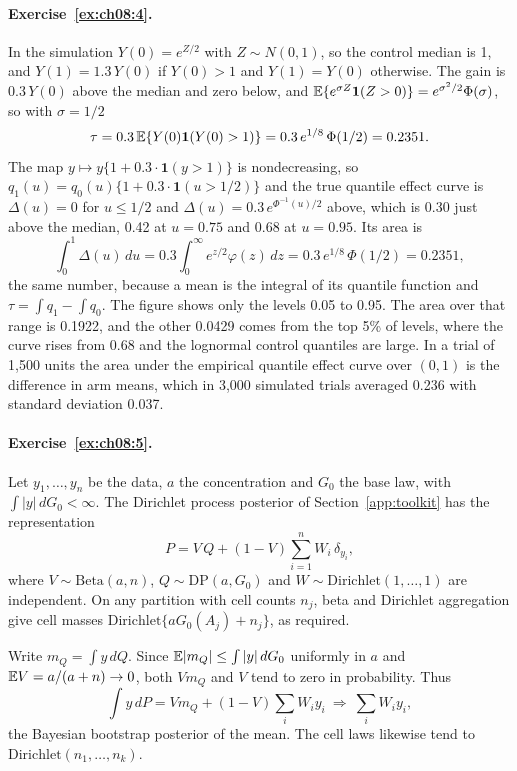 \paragraph{Exercise~\ref{ex:ch08:4}.} In the simulation $Y(0) = e^{Z/2}$ with $Z \sim N(0,1)$, so the control median is 1, and $Y(1) = 1.3\,Y(0)$ if $Y(0) > 1$ and $Y(1) = Y(0)$ otherwise. The gain is $0.3\,Y(0)$ above the median and zero below, and $\mathbb{E}\{e^{\sigma Z}\mathbf{1}(Z > 0)\} = e^{\sigma^2/2}\Phi(\sigma)$, so with $\sigma = 1/2$
\[
\tau = 0.3\,\mathbb{E}\{Y(0)\mathbf{1}(Y(0) > 1)\} = 0.3\,e^{1/8}\,\Phi(1/2) = 0.2351.
\]
The map $y \mapsto y\{1 + 0.3\cdot\mathbf{1}(y > 1)\}$ is nondecreasing, so $q_1(u) = q_0(u)\{1 + 0.3\cdot\mathbf{1}(u > 1/2)\}$ and the true quantile effect curve is $\Delta(u) = 0$ for $u \le 1/2$ and $\Delta(u) = 0.3\,e^{\Phi^{-1}(u)/2}$ above, which is 0.30 just above the median, 0.42 at $u = 0.75$ and 0.68 at $u = 0.95$. Its area is
\[
\int_0^1 \Delta(u)\,du = 0.3\int_0^\infty e^{z/2}\varphi(z)\,dz = 0.3\,e^{1/8}\,\Phi(1/2) = 0.2351,
\]
the same number, because a mean is the integral of its quantile function and $\tau = \int q_1 - \int q_0$. The figure shows only the levels 0.05 to 0.95. The area over that range is 0.1922, and the other 0.0429 comes from the top 5\% of levels, where the curve rises from 0.68 and the lognormal control quantiles are large. In a trial of 1{,}500 units the area under the empirical quantile effect curve over $(0, 1)$ is the difference in arm means, which in 3{,}000 simulated trials averaged 0.236 with standard deviation 0.037.

\paragraph{Exercise~\ref{ex:ch08:5}.} Let $y_1, \ldots, y_n$ be the data, $a$ the concentration and $G_0$ the base law, with $\int |y|\,dG_0 < \infty$. The Dirichlet process posterior of Section~\ref{app:toolkit} has the representation
\[
P = V\,Q + (1 - V)\sum_{i=1}^n W_i\,\delta_{y_i},
\]
where $V \sim \mathrm{Beta}(a, n)$, $Q \sim \mathrm{DP}(a, G_0)$ and $W \sim \mathrm{Dirichlet}(1, \ldots, 1)$ are independent. On any partition with cell counts $n_j$, beta and Dirichlet aggregation give cell masses $\mathrm{Dirichlet}\{aG_0(A_j) + n_j\}$, as required.

Write $m_Q = \int y\,dQ$. Since $\mathbb{E}|m_Q| \le \int |y|\,dG_0$ uniformly in $a$ and $\mathbb{E} V = a/(a + n) \to 0$, both $V m_Q$ and $V$ tend to zero in probability. Thus
\[
\int y\,dP = V m_Q + (1 - V)\sum_i W_i y_i \ \Rightarrow\ \sum_i W_i y_i,
\]
the Bayesian bootstrap posterior of the mean. The cell laws likewise tend to $\mathrm{Dirichlet}(n_1, \ldots, n_k)$.

